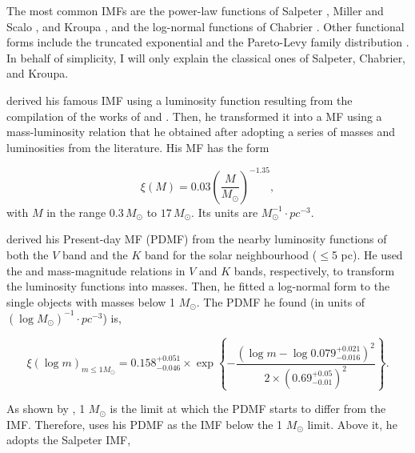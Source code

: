 The most common IMFs are the power-law functions of Salpeter \citep{Salpeter1955}, Miller and Scalo \citep{1979ApJS...41..513M}, and Kroupa \citep{2001MNRAS.322..231K,2002Sci...295...82K,2013pss5.book..115K,Thies2007,2008MNRAS.390.1200T}, and the log-normal functions of Chabrier \citep{Chabrier2003a,Chabrier2003b,Chabrier2005}. Other functional forms include the truncated exponential \citep{2001AGM....18S0551D} and the Pareto-Levy family distribution \citep{2012MNRAS.423.1018C}. In behalf of simplicity, I will only explain the classical ones of Salpeter, Chabrier, and Kroupa.

\citet{Salpeter1955} derived his famous IMF using a luminosity function resulting from the compilation of the works of \citet{1939POMin...7....1L,1941NYASA..42..201L} and \citet{1925PGro...38D...1V,1936PGro...47....1V}. Then, he transformed it into a MF using a mass-luminosity relation that he obtained after adopting a series of masses and luminosities from the literature. His MF has the form

\begin{equation}
\xi(M)=0.03 \left(\frac{M}{M_{\odot}}\right)^{-1.35},\nonumber
\end{equation}
with $M$ in the range $0.3\,M_{\odot}$ to  $17\,M_{\odot}$. Its units are $ M_{\odot}^{-1} \cdot pc^{-3}$.

\citet{Chabrier2003a,Chabrier2003b} derived his Present-day MF (PDMF) from the nearby luminosity functions of both the $V$ band \citep{1986AJ.....91..621D} and the $K$ band \citep{1990ApJ...350..334H} for the solar neighbourhood ($\leq$5 pc). He used the \citet{2000A&A...364..217D} and \citet{1998A&A...337..403B} mass-magnitude relations in $V$ and $K$ bands, respectively, to transform the luminosity functions into masses. Then, he fitted a log-normal form to the single objects with masses below 1 $M_{\odot}$. The PDMF he found (in units of $(\log M_{\odot})^{-1}\cdot pc^{-3}$) is,

\begin{equation}
\xi(\log m)_{m\leq1M_{\odot}}=0.158_{-0.046}^{+0.051} \times \exp{\left\{-\frac{(\log m - \log 0.079_{-0.016}^{+0.021})^2}{2 \times (0.69_{-0.01}^{+0.05})^2}\right\}}.\nonumber
\end{equation}

As shown by \citet{1986FCPh...11....1S}, 1 $M_{\odot}$ is the limit at which the PDMF starts to differ from the IMF. Therefore, \citet{Chabrier2003b} uses his PDMF as the IMF below the 1 $M_{\odot}$ limit. Above it, he adopts the Salpeter IMF,

